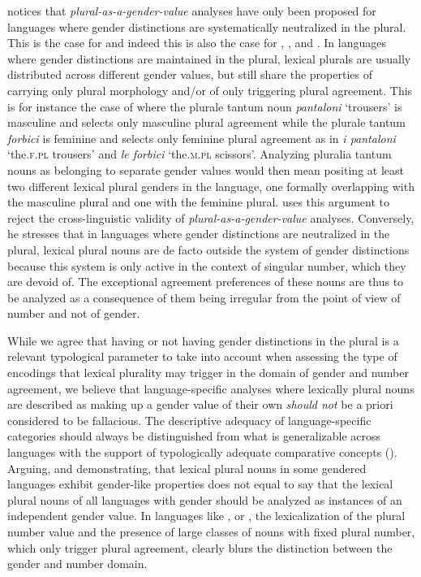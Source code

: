 \documentclass[output=collectionpaper]{langsci/langscibook}
\begin{document}
\cite[237--238]{Corbett2012} notices that \emph{plural-as-a-gender-value} analyses have only been proposed for languages where gender distinctions are systematically neutralized in the plural. This is the case for  and indeed this is also the case for , ,  and . In languages where gender distinctions are maintained in the plural, lexical plurals are usually distributed across different gender values, but still share the properties of carrying only plural morphology and/or of only triggering plural agreement. This is for instance the case of  where the plurale tantum noun \textit{pantaloni} `trousers' is masculine and selects only masculine plural agreement while the plurale tantum \textit{forbici} is feminine and selects only feminine plural agreement as in \textit{i pantaloni} `the.\textsc{f.pl} trousers' and \textit{le forbici} `the.\textsc{m.pl} scissors'. Analyzing  pluralia tantum nouns as belonging to separate gender values would then mean positing at least two different lexical plural genders in the language, one formally overlapping with the masculine plural and one with the feminine plural. \cite[237--238]{Corbett2012} uses this argument to reject the cross-linguistic validity of \textit{plural-as-a-gender-value} analyses. Conversely, he stresses that in languages where gender distinctions are neutralized in the plural, lexical plural nouns are de facto outside the system of gender distinctions because this system is only active in the context of singular number, which they are devoid of. The exceptional agreement preferences of these nouns are thus to be analyzed as a consequence of them being irregular from the point of view of number and not of gender.

While we agree that having or not having gender distinctions in the plural is a relevant typological parameter to take into account when assessing the type of encodings that lexical plurality may trigger in the domain of gender and number agreement, we believe that language-specific analyses where lexically plural nouns are described as making up a gender value of their own \emph{should not} be a priori considered to be fallacious. The descriptive adequacy of language-specific categories should always be distinguished from what is generalizable across languages with the support of typologically adequate comparative concepts (\citealt{Haspelmath2010}). Arguing, and demonstrating, that lexical plural nouns in some gendered languages exhibit gender-like properties does not equal to say that the lexical plural nouns of all languages with gender should be analyzed as instances of an independent gender value. In languages like ,  or , the lexicalization of the plural number value and the presence of large classes of nouns with fixed plural number, which only trigger plural agreement, clearly blurs the distinction between the gender and number domain.
\end{document}
